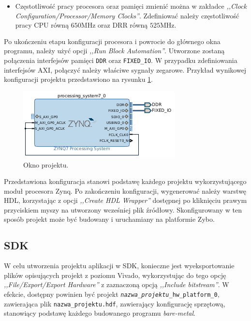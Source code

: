\begin{itemize}
	\item Częstotliwość pracy procesora oraz pamięci zmienić można w zakładce \emph{,,Clock Configuration/Processor/Memory Clocks''}. Zdefiniować należy częstotliwość pracy CPU równą $650$MHz oraz DRR równą $525$MHz.

\end{itemize}

Po ukończeniu etapu konfiguracji procesora i powrocie do głównego okna programu, należy użyć opcji \emph{,,Run Block Automation''}. 
Utworzone zostaną połączenia interfejsów pamięci \texttt{DDR} oraz \texttt{FIXED\_IO}.
W przypadku zdefiniowania interfejsów AXI, połączyć należy właściwe sygnały zegarowe. 
Przykład wynikowej konfiguracji projektu przedstawiono na rysunku \ref{fig:vivado-config-result}.

	\begin{figure}[ht]
		\centering
		\includegraphics[]{img/vivado/vivado-config-result.png}
		\caption{Okno projektu.}
		\label{fig:vivado-config-result}
	\end{figure}
	
Przedstawiona konfiguracja stanowi podstawę każdego projektu wykorzystującego moduł procesora Zynq.
Po zakończeniu konfiguracji, wygenerować należy warstwę HDL, korzystając z opcji \emph{,,Create HDL Wrapper''} dostępnej po kliknięciu prawym przyciskiem myszy na utworzony wcześniej plik źródłowy.
Skonfigurowany w ten sposób projekt może być budowany i uruchamiany na platformie Zybo.

\subsection{SDK}

W celu utworzenia projektu aplikacji w SDK, konieczne jest wyeksportowanie plików opisujących projekt z poziomu Vivado, wykorzystując do tego opcję \emph{,,File/Export/Export Hardware''} z zaznaczoną opcją \emph{,,Include bitstream''}.
W efekcie, dostępny powinien być projekt \texttt{\textit{nazwa\_projektu}\_hw\_platform\_0}, zawierająca plik \texttt{nazwa\_projektu.hdf}, zawierający konfigurację sprzętową, stanowiący podstawę każdego budowanego programu \textit{bare-metal}. %

